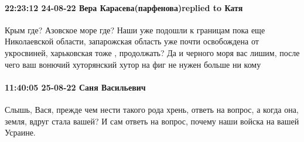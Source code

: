 \paragraph{22:23:12 24-08-22 Вера Карасева(парфенова)replied to Катя}

Крым где? Азовское море где? Наши уже подошли к границам пока еще Николаевской
области, запарожская область уже почти освобождена от укросвиней, харьковская
тоже , продолжать? Да и черного моря вас лишим, после чего ваш вонючий
хуторянский хутор на фиг не нужен больше ни кому

\paragraph{11:40:05 25-08-22 Саня Васильевич}

Слышь, Вася, прежде чем нести такого рода хрень, ответь на вопрос, а когда она,
земля, вдруг стала вашей? И сам ответь на вопрос, почему наши войска на вашей
Усраине.

